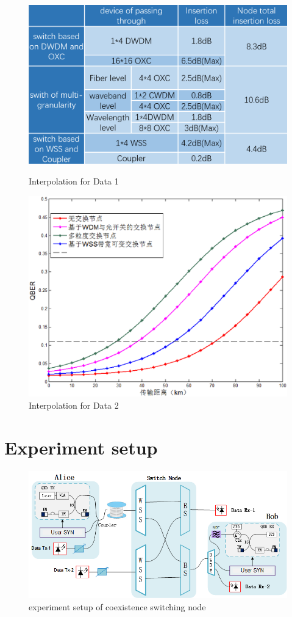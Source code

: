 \documentclass[letterpaper,10pt]{article}
\begin{document}
\begin{figure}[!htb]
   \begin{minipage}{0.48\textwidth}
     \centering
     \includegraphics[width=.9\linewidth]{comparison_of_three_kind_of_nodes}
     \caption{Interpolation for Data 1}\label{Fig:Data1}
   \end{minipage}\hfill
   \begin{minipage}{0.48\textwidth}
     \centering
     \includegraphics[width=.9\linewidth]{distance_of_transmission}
     \caption{Interpolation for Data 2} \label{tbl:excel-table}
   \end{minipage}
\end{figure}

\section{Experiment setup}

\begin{figure}
 \centering
 \includegraphics[width=.8\linewidth]{experiment_of_switching_node}
 \caption{experiment setup of coexistence switching node}
\end{figure}
\end{document}
